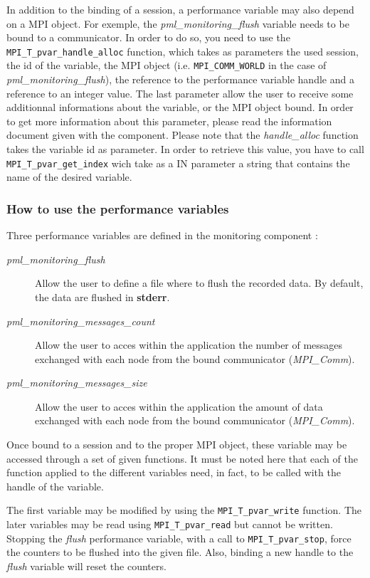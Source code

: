 \documentclass[notitlepage]{article}
\begin{document}
In addition to the binding of a session, a performance variable may
also depend on a MPI object. For exemple, the
\textit{pml\_monitoring\_flush} variable needs to be bound to a
communicator. In order to do so, you need to use the
\texttt{MPI\_T\_pvar\_handle\_alloc} function, which takes as
parameters the used session, the id of the variable, the MPI object
(i.e. \texttt{MPI\_COMM\_WORLD} in the case of
\textit{pml\_monitoring\_flush}), the reference to the performance
variable handle and a reference to an integer value. The last
parameter allow the user to receive some additionnal informations
about the variable, or the MPI object bound. In order to get more
information about this parameter, please read the information document
given with the component. Please note that the \textit{handle\_alloc}
function takes the variable id as parameter. In order to retrieve this
value, you have to call \texttt{MPI\_T\_pvar\_get\_index} wich take as
a IN parameter a string that contains the name of the desired
variable.

\subsubsection{How to use the performance variables}

Three performance variables are defined in the monitoring component :
\begin{description}
\item [\textit{pml\_monitoring\_flush}] Allow the user to define a file
  where to flush the recorded data. By default, the data are flushed
  in \textbf{stderr}.
\item [\textit{pml\_monitoring\_messages\_count}] Allow the user to acces
  within the application the number of messages exchanged with each
  node from the bound communicator (\textit{MPI\_Comm}).
\item [\textit{pml\_monitoring\_messages\_size}] Allow the user to acces
  within the application the amount of data exchanged with each node
  from the bound communicator (\textit{MPI\_Comm}).
\end{description}

Once bound to a session and to the proper MPI object, these variable
may be accessed through a set of given functions. It must be noted
here that each of the function applied to the different variables
need, in fact, to be called with the handle of the variable.

The first variable may be modified by using the
\texttt{MPI\_T\_pvar\_write} function. The later variables may be read
using \texttt{MPI\_T\_pvar\_read} but cannot be written. Stopping the
\textit{flush} performance variable, with a call to
\texttt{MPI\_T\_pvar\_stop}, force the counters to be flushed into the
given file. Also, binding a new handle to the \textit{flush} variable
will reset the counters.
\end{document}

